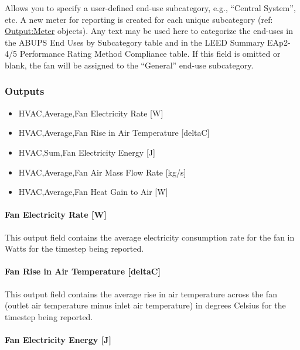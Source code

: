 Allows you to specify a user-defined end-use subcategory, e.g., ``Central System'', etc. A new meter for reporting is created for each unique subcategory (ref: \hyperref[outputmeter-and-outputmetermeterfileonly]{Output:Meter} objects). Any text may be used here to categorize the end-uses in the ABUPS End Uses by Subcategory table and in the LEED Summary EAp2-4/5 Performance Rating Method Compliance table. If this field is omitted or blank, the fan will be assigned to the ``General'' end-use subcategory.

\subsubsection{Outputs}\label{outputs-013}

\begin{itemize}
\item
  HVAC,Average,Fan Electricity Rate {[}W{]}
\item
  HVAC,Average,Fan Rise in Air Temperature {[}deltaC{]}
\item
  HVAC,Sum,Fan Electricity Energy {[}J{]}
\item
  HVAC,Average,Fan Air Mass Flow Rate {[}kg/s{]}
\item
  HVAC,Average,Fan Heat Gain to Air {[}W{]}
\end{itemize}

\paragraph{Fan Electricity Rate {[}W{]}}\label{fan-electric-power-w}

This output field contains the average electricity consumption rate for the fan in Watts for the timestep being reported.

\paragraph{Fan Rise in Air Temperature {[}deltaC{]}}\label{fan-rise-in-air-temperature-deltac}

This output field contains the average rise in air temperature across the fan (outlet air temperature minus inlet air temperature) in degrees Celsius for the timestep being reported.

\paragraph{Fan Electricity Energy {[}J{]}}\label{fan-electric-energy-j}

